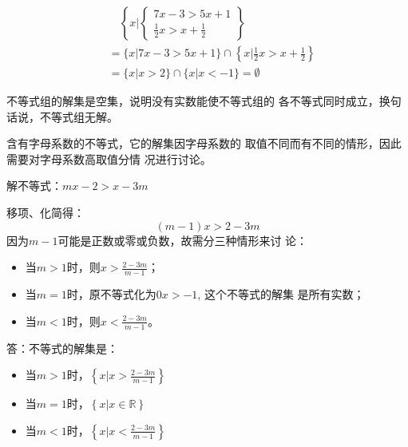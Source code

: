 \begin{solution}
 \[\begin{split}
&  \quad \left\{x\Big|\begin{cases}
    7x-3>5x+1\\
    \frac{1}{2}x>x+\frac{1}{2}
\end{cases} \right\}   \\
&=\{x|7x-3>5x+1 \}\cap\left\{x|\frac{1}{2}x>x+\frac{1}{2}\right\}\\
&=\{x|x>2\}\cap\{x|x<-1\}=\emptyset
 \end{split}\]  
\begin{figure}[htp]
    \centering
{}
    \caption{}
\end{figure}

 不等式组的解集是空集，说明没有实数能使不等式组的
各不等式同时成立，换句话说，不等式组无解。
\end{solution}

\begin{rmk}
    含有字母系数的不等式，它的解集因字母系数的
取值不同而有不同的情形，因此需要对字母系数高取值分情
况进行讨论。
\end{rmk}

\begin{example}
    解不等式：$mx-2>x-3m$
\end{example}

\begin{solution}
移项、化简得：
\[(m-1)x>2-3m\]
因为$m-1$可能是正数或零或负数，故需分三种情形来讨
论：
\begin{itemize}
    \item 当$m>1$时，则$x>\frac{2-3m}{m-1}$；
\item 当$m=1$时，原不等式化为$0x>-1$, 这个不等式的解集
是所有实数；
\item 当$m<1$时，则$x<\frac{2-3m}{m-1}$。
\end{itemize}

答：不等式的解集是：
\begin{itemize}
    \item 当$m>1$时，$\left\{x\Big| x>\frac{2-3m}{m-1}\right\}$
    \item 当$m=1$时，$\left\{x\Big| x\in\mathbb{R}\right\}$
    \item 当$m<1$时，$\left\{x\Big| x<\frac{2-3m}{m-1}\right\}$
\end{itemize}
\end{solution}

